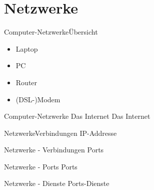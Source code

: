 
\section{Netzwerke}



\begin{frame}{Computer-Netzwerke}{Übersicht}

	
	\begin{itemize}
	\item Laptop
	\item PC
	\item Router
	\item (DSL-)Modem
	\end{itemize}
	

\end{frame}

\begin{frame}{Computer-Netzwerke} {Das Internet}
	Das Internet
\end{frame}




\begin{frame}{Netzwerke}{Verbindungen}
	IP-Addresse
\end{frame}

\begin{frame}{Netzwerke - Verbindungen}
	Ports
\end{frame}


\begin{frame}{Netzwerke - Ports}
	Ports
\end{frame}

\begin{frame}{Netzwerke - Dienste}
	Ports-Dienste
\end{frame}











